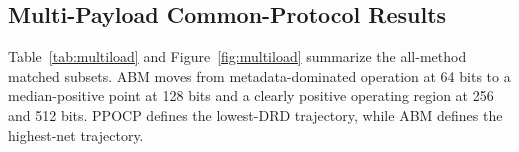 \documentclass[a4paper,fleqn]{cas-dc}
\begin{document}
\subsection{Multi-Payload Common-Protocol Results}

Table~\ref{tab:multiload} and Figure~\ref{fig:multiload} summarize the
all-method matched subsets. ABM moves from metadata-dominated operation at 64
bits to a median-positive point at 128 bits and a clearly positive operating
region at 256 and 512 bits. PPOCP defines the lowest-DRD trajectory, while ABM
defines the highest-net trajectory.

\begin{table}[t]
\centering
\caption{Mean net bits and median DRD on all-method matched images.}
\label{tab:multiload}
\end{table}
\end{document}
